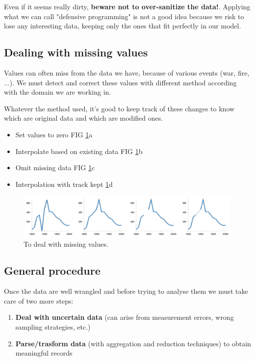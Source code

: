 \documentclass[a4paper,11pt,twoside]{article}
\begin{document}
Even if it seems really dirty, \textbf{beware not to over-sanitize the data!}. Applying what we can call "defensive programming" is not a good idea because we risk to lose any interesting data, keeping only the ones that fit perfectly in our model.

\subsection{Dealing with missing values}

Values can often miss from the data we have, because of various events (war, fire, ...). We must detect and correct these values with different method according with the domain we are working in.

Whatever the method used, it's good to keep track of these changes to know which are original data and which are modified ones.

\begin{itemize}
  \item Set values to zero FIG \ref{miss_val}a
  \item Interpolate based on existing data FIG \ref{miss_val}b
  \item Omit missing data FIG \ref{miss_val}c
  \item Interpolation with track kept \ref{miss_val}d
\end{itemize}

\begin{figure}%
 \centering
 \includegraphics[width=12cm]{./pic/missing_values}
 \caption{\label{miss_val}To deal with missing values.}
\end{figure}

\subsection{General procedure}

Once the data are well wrangled and before trying to analyse them we must take care of two more steps:

\begin{enumerate}
  \item \textbf{Deal with uncertain data} (can arise from measurement errors, wrong sampling strategies, etc.)
  \item \textbf{Parse/trasform data} (with aggregation and reduction techniques) to obtain meaningful records
\end{enumerate}
 
\end{document}
